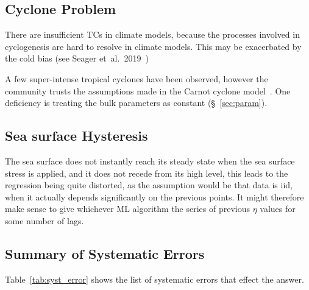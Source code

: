 \subsection{Cyclone Problem}
There are insufficient TCs in climate models, because the processes involved
in cyclogenesis are hard to resolve in climate models. This may be
exacerbated by the cold bias (see Seager et~al.~2019~\cite{seager2019strengthening})

A few super-intense tropical cyclones have been observed, however the community
 trusts the assumptions made in the
Carnot cyclone model~\cite{camargo2019tropical}.
One deficiency is treating the bulk parameters
as constant (§~\ref{sec:param}).

\subsection{Sea surface Hysteresis}
The sea surface does not instantly reach its steady state when the sea surface
stress is applied, and it does not recede from its high level, this leads
to the regression being quite distorted, as the assumption would be that data
is iid, when it actually depends significantly on the previous points.
It might therefore make sense to give whichever ML algorithm
the series of previous $\eta$ values for some number of lags.


\subsection{Summary of Systematic Errors}
\label{sec:sys-errors}
Table~\ref{tab:syst_error} shows the list of systematic errors that effect the
answer.


